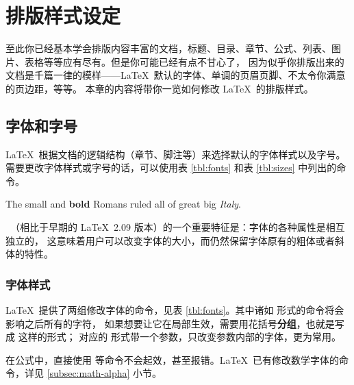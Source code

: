 \chapter{排版样式设定}\label{chap:styles}

\begin{intro}
至此你已经基本学会排版内容丰富的文档，标题、目录、章节、公式、列表、图片、表格等等应有尽有。但是你可能已经有点不甘心了，
因为似乎你排版出来的文档是千篇一律的模样——\LaTeX\ 默认的字体、单调的页眉页脚、不太令你满意的页边距，等等。
本章的内容将带你一览如何修改 \LaTeX\ 的排版样式。
\end{intro}

\section{字体和字号}\label{sec:font}

\LaTeX\ 根据文档的逻辑结构（章节、脚注等）来选择默认的字体样式以及字号。
需要更改字体样式或字号的话，可以使用表 \ref{tbl:fonts} 和表 \ref{tbl:sizes} 中列出的命令。
\begin{example}
{\small The small and
\textbf{bold} Romans ruled}
{\Large all of great big
{\itshape Italy}.}
\end{example}

\LaTeXe\ （相比于早期的 \LaTeX\ 2.09 版本）的一个重要特征是：字体的各种属性是相互独立的，
这意味着用户可以改变字体的大小，而仍然保留字体原有的粗体或者斜体的特性。

\subsection{字体样式}\label{subsec:fontshape}

\LaTeX\ 提供了两组修改字体的命令，见表 \ref{tbl:fonts}。其中诸如  形式的命令将会影响之后所有的字符，
如果想要让它在局部生效，需要用花括号\textbf{分组}，也就是写成  这样的形式；
对应的  形式带一个参数，只改变参数内部的字体，更为常用。

在公式中，直接使用  等命令不会起效，甚至报错。\LaTeX\ 已有修改数学字体的命令，详见 \ref{subsec:math-alpha} 小节。

